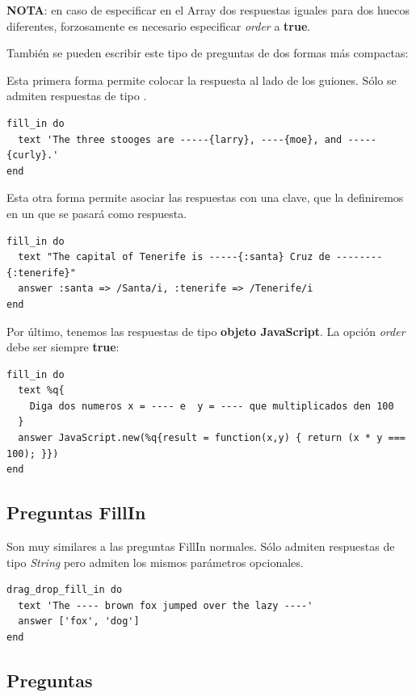 {\bfseries NOTA}: en caso de especificar en el Array dos respuestas iguales para dos huecos diferentes, forzosamente es necesario especificar \textit{order} a {\bfseries true}.
\bigskip

Tambi\'en se pueden escribir este tipo de preguntas de dos formas m\'as compactas:
\bigskip

Esta primera forma permite colocar la respuesta al lado de los guiones. S\'olo se admiten respuestas de tipo .
\begin{lstlisting}
fill_in do
  text 'The three stooges are -----{larry}, ----{moe}, and -----{curly}.'
end
\end{lstlisting}
\bigskip

Esta otra forma permite asociar las respuestas con una clave, que la definiremos en un  que se pasar\'a como respuesta.
\begin{lstlisting}
fill_in do
  text "The capital of Tenerife is -----{:santa} Cruz de --------{:tenerife}"
  answer :santa => /Santa/i, :tenerife => /Tenerife/i
end
\end{lstlisting}
\bigskip

Por \'ultimo, tenemos las respuestas de tipo {\bfseries objeto JavaScript}. La opci\'on \textit{order} debe ser siempre {\bfseries true}:
\begin{lstlisting}
fill_in do
  text %q{
    Diga dos numeros x = ---- e  y = ---- que multiplicados den 100
  }
  answer JavaScript.new(%q{result = function(x,y) { return (x * y === 100); }})
end
\end{lstlisting}

\subsection{Preguntas  FillIn}
\label{subsec:Apendice2.2}

Son muy similares a las preguntas FillIn normales. S\'olo admiten respuestas de tipo \textit{String} pero admiten los mismos par\'ametros opcionales.
\begin{lstlisting}
drag_drop_fill_in do
  text 'The ---- brown fox jumped over the lazy ----'
  answer ['fox', 'dog']
end
\end{lstlisting}

\subsection{Preguntas }
\label{subsec:Apendice2.3}

